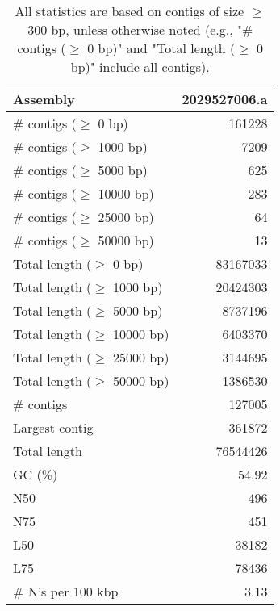 \documentclass[12pt,a4paper]{article}
\begin{document}
\begin{table}[ht]
\begin{center}
\caption{All statistics are based on contigs of size $\geq$ 300 bp, unless otherwise noted (e.g., "\# contigs ($\geq$ 0 bp)" and "Total length ($\geq$ 0 bp)" include all contigs).}
\begin{tabular}{|l*{1}{|r}|}
\hline
Assembly & 2029527006.a \\ \hline
\# contigs ($\geq$ 0 bp) & 161228 \\ \hline
\# contigs ($\geq$ 1000 bp) & 7209 \\ \hline
\# contigs ($\geq$ 5000 bp) & 625 \\ \hline
\# contigs ($\geq$ 10000 bp) & 283 \\ \hline
\# contigs ($\geq$ 25000 bp) & 64 \\ \hline
\# contigs ($\geq$ 50000 bp) & 13 \\ \hline
Total length ($\geq$ 0 bp) & 83167033 \\ \hline
Total length ($\geq$ 1000 bp) & 20424303 \\ \hline
Total length ($\geq$ 5000 bp) & 8737196 \\ \hline
Total length ($\geq$ 10000 bp) & 6403370 \\ \hline
Total length ($\geq$ 25000 bp) & 3144695 \\ \hline
Total length ($\geq$ 50000 bp) & 1386530 \\ \hline
\# contigs & 127005 \\ \hline
Largest contig & 361872 \\ \hline
Total length & 76544426 \\ \hline
GC (\%) & 54.92 \\ \hline
N50 & 496 \\ \hline
N75 & 451 \\ \hline
L50 & 38182 \\ \hline
L75 & 78436 \\ \hline
\# N's per 100 kbp & 3.13 \\ \hline
\end{tabular}
\end{center}
\end{table}
\end{document}
